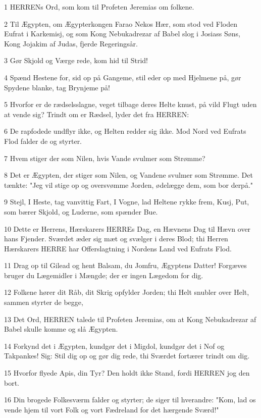\par 1 HERRENs Ord, som kom til Profeten Jeremias om folkene.
\par 2 Til Ægypten, om Ægypterkongen Farao Nekos Hær, som stod ved Floden Eufrat i Karkemisj, og som Kong Nebukadrezar af Babel slog i Josiass Søns, Kong Jojakim af Judas, fjerde Regeringsår.
\par 3 Gør Skjold og Værge rede, kom hid til Strid!
\par 4 Spænd Hestene for, sid op på Gangeme, stil eder op med Hjelmene på, gør Spydene blanke, tag Brynjeme på!
\par 5 Hvorfor er de rædselsslagne, veget tilbage deres Helte knust, på vild Flugt uden at vende sig? Trindt om er Rædsel, lyder det fra HERREN:
\par 6 De rapfodede undflyr ikke, og Helten redder sig ikke. Mod Nord ved Eufrats Flod falder de og styrter.
\par 7 Hvem stiger der som Nilen, hvis Vande svulmer som Strømme?
\par 8 Det er Ægypten, der stiger som Nilen, og Vandene svulmer som Strømme. Det tænkte: "Jeg vil stige op og oversvømme Jorden, ødelægge dem, som bor derpå."
\par 9 Stejl, I Heste, tag vanvittig Fart, I Vogne, lad Heltene rykke frem, Kusj, Put, som bærer Skjold, og Luderne, som spænder Bue.
\par 10 Dette er Herrens, Hærskarers HERREs Dag, en Hævnens Dag til Hævn over hans Fjender. Sværdet æder sig mæt og svælger i deres Blod; thi Herren Hærskarers HERRE har Offerslagtning i Nordens Land ved Eufrats Flod.
\par 11 Drag op til Gilead og hent Balsam, du Jomfru, Ægyptens Datter! Forgæves bruger du Lægemidler i Mængde; der er ingen Lægedom for dig.
\par 12 Folkene hører dit Råb, dit Skrig opfylder Jorden; thi Helt snubler over Helt, sammen styrter de begge,
\par 13 Det Ord, HERREN talede til Profeten Jeremias, om at Kong Nebukadrezar af Babel skulle komme og slå Ægypten.
\par 14 Forkynd det i Ægypten, kundgør det i Migdol, kundgør det i Nof og Takpankes! Sig: Stil dig op og gør dig rede, thi Sværdet fortærer trindt om dig.
\par 15 Hvorfor flyede Apis, din Tyr? Den holdt ikke Stand, fordi HERREN jog den bort.
\par 16 Din brogede Folkesværm falder og styrter; de siger til hverandre: "Kom, lad os vende hjem til vort Folk og vort Fædreland for det hærgende Sværd!"

